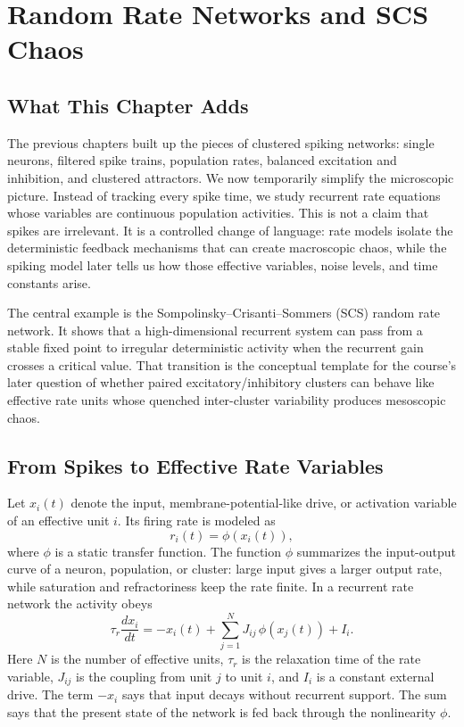
\chapter{Random Rate Networks and SCS Chaos}
\label{ch:random-rate-networks-scs-chaos}

\section*{What This Chapter Adds}

The previous chapters built up the pieces of clustered spiking networks: single
neurons, filtered spike trains, population rates, balanced excitation and
inhibition, and clustered attractors. We now temporarily simplify the
microscopic picture. Instead of tracking every spike time, we study recurrent
rate equations whose variables are continuous population activities. This is not
a claim that spikes are irrelevant. It is a controlled change of language: rate
models isolate the deterministic feedback mechanisms that can create
macroscopic chaos, while the spiking model later tells us how those effective
variables, noise levels, and time constants arise.

The central example is the Sompolinsky--Crisanti--Sommers (SCS) random rate
network. It shows that a high-dimensional recurrent system can pass from a
stable fixed point to irregular deterministic activity when the recurrent gain
crosses a critical value. That transition is the conceptual template for the
course's later question of whether paired excitatory/inhibitory clusters can
behave like effective rate units whose quenched inter-cluster variability
produces mesoscopic chaos.

\section{From Spikes to Effective Rate Variables}
\label{sec:ch06-rate-variables}

Let \(x_i(t)\) denote the input, membrane-potential-like drive, or activation
variable of an effective unit \(i\). Its firing rate is modeled as
\[
        r_i(t) = \phi(x_i(t)),
\]
where \(\phi\) is a static transfer function. The function \(\phi\) summarizes
the input-output curve of a neuron, population, or cluster: large input gives a
larger output rate, while saturation and refractoriness keep the rate finite.
In a recurrent rate network the activity obeys
\[
        \tau_r \frac{d x_i}{dt}
        =
        -x_i(t) + \sum_{j=1}^{N} J_{ij}\,\phi(x_j(t)) + I_i .
        \label{eq:ch06-basic-rate-network}
\]
Here \(N\) is the number of effective units, \(\tau_r\) is the relaxation time of
the rate variable, \(J_{ij}\) is the coupling from unit \(j\) to unit \(i\), and
\(I_i\) is a constant external drive. The term \(-x_i\) says that input decays
without recurrent support. The sum says that the present state of the network
is fed back through the nonlinearity \(\phi\).

